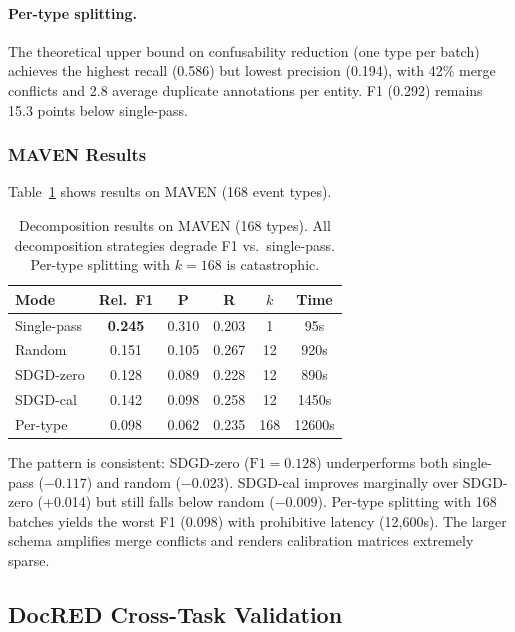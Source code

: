 \documentclass[11pt,a4paper]{article}
\begin{document}
\paragraph{Per-type splitting.} The theoretical upper bound on confusability reduction (one type per batch) achieves the highest recall (0.586) but lowest precision (0.194), with 42\% merge conflicts and 2.8 average duplicate annotations per entity. F1 (0.292) remains 15.3 points below single-pass.

\subsubsection{MAVEN Results}

Table~\ref{tab:sdgd_maven} shows results on MAVEN (168 event types).

\begin{table}[t]
\centering
\small
\begin{tabular}{lccccc}
\toprule
Mode & Rel.\ F1 & P & R & $k$ & Time \\
\midrule
Single-pass & \textbf{0.245} & 0.310 & 0.203 & 1 & 95s \\
Random & 0.151 & 0.105 & 0.267 & 12 & 920s \\
SDGD-zero & 0.128 & 0.089 & 0.228 & 12 & 890s \\
SDGD-cal & 0.142 & 0.098 & 0.258 & 12 & 1450s \\
Per-type & 0.098 & 0.062 & 0.235 & 168 & 12600s \\
\bottomrule
\end{tabular}
\caption{Decomposition results on MAVEN (168 types). All decomposition strategies degrade F1 vs.\ single-pass. Per-type splitting with $k{=}168$ is catastrophic.}
\label{tab:sdgd_maven}
\end{table}

The pattern is consistent: SDGD-zero ($\text{F1}{=}0.128$) underperforms both single-pass ($-0.117$) and random ($-0.023$). SDGD-cal improves marginally over SDGD-zero (+0.014) but still falls below random ($-0.009$). Per-type splitting with 168 batches yields the worst F1 (0.098) with prohibitive latency (12,600s). The larger schema amplifies merge conflicts and renders calibration matrices extremely sparse.

\subsection{DocRED Cross-Task Validation}
\label{sec:docred}
\end{document}
